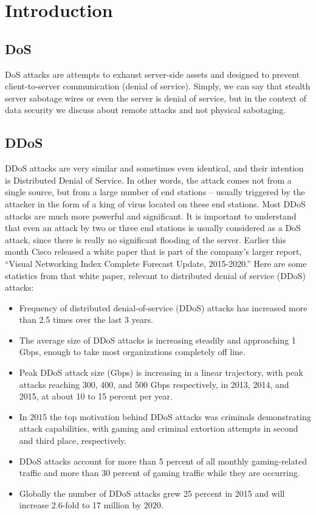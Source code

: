 \documentclass{report}
\begin{document}
\chapter {Introduction}
\section {DoS}
\hfill \break \gls{DoS} attacks are attempts to exhaust server-side assets and designed to prevent client-to-server communication (denial of service). Simply, we can say that stealth server sabotage wires or even the server is denial of service, but in the context of data security we discuss about remote attacks and not physical sabotaging.
\section {DDoS}
\hfill \break \gls{DDoS} attacks are very similar and sometimes even identical, and their intention is Distributed Denial of Service. In other words, the attack comes not from a single source, but from a large number of end stations – usually triggered by the attacker in the form of a king of virus located on these end stations. Most \gls{DDoS} attacks are much more powerful and significant. It is important to understand that even an attack by two or three end stations is usually considered as a \gls{DoS} attack, since there is really no significant flooding of the server.
\hfill \break Earlier this month Cisco released a white paper that \cite{corero} is part of the company’s larger report, “Visual Networking Index Complete Forecast Update, 2015-2020.” Here are some statistics from that white paper, relevant to distributed denial of service (\gls{DDoS}) attacks:
\begin{itemize}
\item Frequency of distributed denial-of-service (\gls{DDoS}) attacks has increased more than 2.5 times over the last 3 years.
\item	The average size of \gls{DDoS} attacks is increasing steadily and approaching 1 Gbps, enough to take most organizations completely off line.
\item	Peak \gls{DDoS} attack size (Gbps) is increasing in a linear trajectory, with peak attacks reaching 300, 400, and 500 Gbps respectively, in 2013, 2014, and 2015, at about 10 to 15 percent per year.
\item	In 2015 the top motivation behind \gls{DDoS} attacks was criminals demonstrating attack capabilities, with gaming and criminal extortion attempts in second and third place, respectively.
\item	\gls{DDoS} attacks account for more than 5 percent of all monthly gaming-related traffic and more than 30 percent of gaming traffic while they are occurring.
\item	Globally the number of \gls{DDoS} attacks grew 25 percent in 2015 and will increase 2.6-fold to 17 million by 2020.
\end{itemize}
\end{document}
